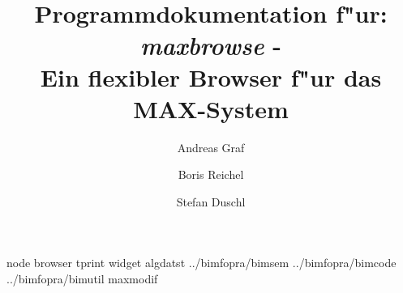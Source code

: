 
\originalTeX

\germanTeX

\pagestyle{plain}



\title{
Programmdokumentation f"ur:\\
\vspace*{1em}
{\em maxbrowse} -\\
Ein flexibler Browser f"ur das MAX-System}

\author{
  Andreas Graf
\and
  Boris Reichel
\and
  Stefan Duschl}

\maketitle
\pagebreak

\tableofcontents

 {node}
 {browser}
 {tprint}
 {widget}
 {algdatst}
 {../bimfopra/bimsem}
 {../bimfopra/bimcode}
 {../bimfopra/bimutil}
 {maxmodif}




